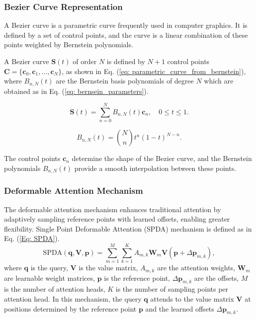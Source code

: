 \subsubsection{Bezier Curve Representation}

A Bezier curve is a parametric curve frequently used in computer graphics. It is defined by a set of control points, and the curve is a linear combination of these points weighted by Bernstein polynomials.

\sloppy
A Bezier curve \( \mathbf{S}(t) \) of order \( N \) is defined by \( N+1 \) control points $\mathbf{C} = \{\mathbf{c}_0, \mathbf{c}_1, \ldots, \mathbf{c}_N\}$, as shown in Eq. (\ref{eq: parametric_curve_from_bernstein}), where \( B_{n,N}(t) \) are the Bernstein basis polynomials of degree \( N \) which are obtained as in Eq. (\ref{eq: bernsein_parameters}). 

\begin{equation}
\mathbf{S}(t) = \sum_{n=0}^{N} B_{n,N}(t) \mathbf{c}_n, \quad 0 \leq t \leq 1.
\label{eq: parametric_curve_from_bernstein}
\end{equation}

\begin{equation}
B_{n,N}(t) = \binom{N}{n} t^n (1 - t)^{N-n}.
\label{eq: bernsein_parameters}
\end{equation}

The control points \( \mathbf{c}_n \) determine the shape of the Bezier curve, and the Bernstein polynomials \( B_{n, N}(t) \) provide a smooth interpolation between these points.


\subsubsection{Deformable Attention Mechanism}

The deformable attention mechanism enhances traditional attention by adaptively sampling reference points with learned offsets, enabling greater flexibility. Single Point Deformable Attention (SPDA) mechanism is defined as in Eq. (\ref{Eq: SPDA}).
\begin{equation}
\text{SPDA}(\mathbf{q}, \mathbf{V}, \mathbf{p}) = \sum_{m=1}^{M} \sum_{k=1}^{K} A_{m,k} \mathbf{W}_m \mathbf{V}(\mathbf{p} + \Delta \mathbf{p}_{m,k}),
\label{Eq: SPDA}
\end{equation}
where \( \mathbf{q} \) is the query, \( \mathbf{V} \) is the value matrix, \( A_{m,k} \) are the attention weights, \( \mathbf{W}_m \) are learnable weight matrices, \( \mathbf{p} \) is the reference point, \( \Delta \mathbf{p}_{m,k} \) are the offsets, \( M \) is the number of attention heads, \( K \) is the number of sampling points per attention head. In this mechanism, the query \( \mathbf{q} \) attends to the value matrix \( \mathbf{V} \) at positions determined by the reference point \( \mathbf{p} \) and the learned offsets \( \Delta \mathbf{p}_{m,k} \).

